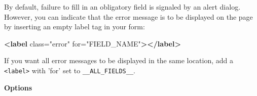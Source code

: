 \documentclass[
]{article}
\newenvironment{Shaded}{}{}
\newcommand{\KeywordTok}[1]{\textcolor[rgb]{0.00,0.44,0.13}{\textbf{#1}}}
\newcommand{\OtherTok}[1]{\textcolor[rgb]{0.00,0.44,0.13}{#1}}
\newcommand{\StringTok}[1]{\textcolor[rgb]{0.25,0.44,0.63}{#1}}
\begin{document}
By default, failure to fill in an obligatory field is signaled by an
alert dialog. However, you can indicate that the error message is to be
displayed on the page by inserting an empty label tag in your form:

\begin{Shaded}
\begin{Highlighting}[]
    \KeywordTok{\textless{}label}\OtherTok{ class=}\StringTok{"error"}\OtherTok{ for=}\StringTok{"FIELD\_NAME"}\KeywordTok{\textgreater{}\textless{}/label\textgreater{}}
\end{Highlighting}
\end{Shaded}

If you want all error messages to be displayed in the same location, add
a \texttt{\textless{}label\textgreater{}} with 'for' set to
\texttt{\_\_ALL\_FIELDS\_\_}.

\textbf{Options}
\end{document}

